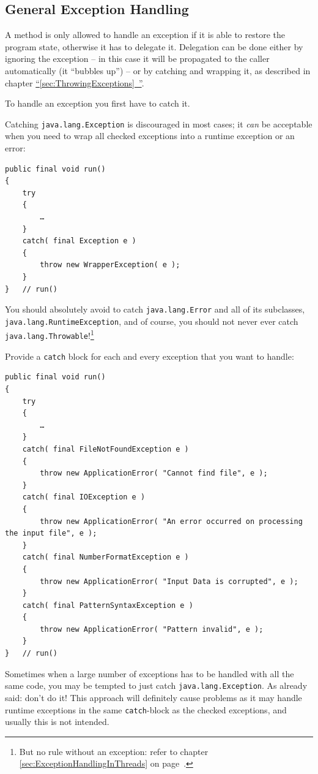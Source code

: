 \documentclass[11pt,a4paper, titlepage, parskip=half, headsepline, footsepline, cleardoublepage=current, headheight=1cm]{scrbook}
\newcommand*{\tqfullref}[1]{\hyperref[{#1}]{“\ref*{#1}~\nameref*{#1}”}}
\newcommand*{\tqvref}[1]{\hyperref[{#1}]{\ref*{#1}} on page~\pageref{#1}}
\begin{document}
\subsection{General Exception Handling}\label{sec:GeneralExceptionHandling}
A method is only allowed to handle an exception if it is able to restore the program state, otherwise it has to delegate it. Delegation can be done either by ignoring the exception – in this case it will be propagated to the caller automatically (it “bubbles up”) – or by catching and wrapping it, as described in chapter \tqfullref{sec:ThrowingExceptions}.

To handle an exception you first have to catch it.

Catching \lstinline|java.lang.Exception| is discouraged in most cases; it \textit{can} be acceptable when you need to wrap all checked exceptions into a runtime exception or an error:
\begin{lstlisting}
public final void run()
{
    try
    {
        …
    }
    catch( final Exception e )
    {
        throw new WrapperException( e );
    }
}   // run()
\end{lstlisting}

You should absolutely avoid to catch \lstinline|java.lang.Error| and all of its subclasses, \lstinline|java.lang.RuntimeException|, and of course, you should not never ever catch \lstinline|java.lang.Throwable|!\footnote{But no rule without an exception: refer to chapter \tqvref{sec:ExceptionHandlingInThreads}.}

Provide a \lstinline|catch| block for each and every exception that you want to handle:
\begin{lstlisting}
public final void run()
{
    try
    {
        …
    }
    catch( final FileNotFoundException e )
    {
        throw new ApplicationError( "Cannot find file", e );
    }
    catch( final IOException e )
    {
        throw new ApplicationError( "An error occurred on processing the input file", e );
    }
    catch( final NumberFormatException e )
    {
        throw new ApplicationError( "Input Data is corrupted", e );
    }
    catch( final PatternSyntaxException e )
    {
        throw new ApplicationError( "Pattern invalid", e );
    }
}   // run()
\end{lstlisting}

Sometimes when a large number of exceptions has to be handled with all the same code, you may be tempted to just catch \lstinline|java.lang.Exception|. As already said: don't do it! This approach will definitely cause problems as it may handle runtime exceptions in the same \lstinline|catch|-block as the checked exceptions, and usually this is not intended.
\end{document}
